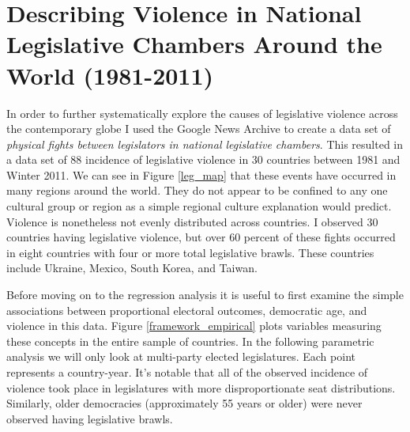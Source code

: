 \documentclass[a4paper]{article}\usepackage[]{graphicx}\usepackage[]{color}
\begin{document}
\section{Describing Violence in National Legislative Chambers Around the World (1981-2011)}

In order to further systematically explore the causes of legislative violence across the contemporary globe I used the Google News Archive to create a data set of {\emph{physical fights between legislators in national legislative chambers}}. This resulted in a data set of 88 incidence of legislative violence in 30 countries between 1981 and Winter 2011. We can see in Figure \ref{leg_map} that these events have occurred in many regions around the world. They do not appear to be confined to any one cultural group or region as a simple regional culture explanation would predict. Violence is nonetheless not evenly distributed across countries. I observed 30 countries having legislative violence, but over 60 percent of these fights occurred in eight countries with four or more total legislative brawls. These countries include Ukraine, Mexico, South Korea, and Taiwan. 

Before moving on to the regression analysis it is useful to first examine the simple associations between proportional electoral outcomes, democratic age, and violence in this data. Figure \ref{framework_empirical} plots variables measuring these concepts in the entire sample of countries. In the following parametric analysis we will only look at multi-party elected legislatures. Each point represents a country-year. It's notable that all of the observed incidence of violence took place in legislatures with more disproportionate seat distributions. Similarly, older democracies (approximately 55 years or older) were never observed having legislative brawls. 
\end{document}
